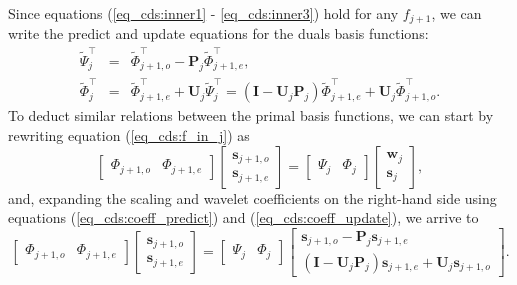 \documentclass[graybox]{svmult}
\begin{document}
	
	Since equations (\ref{eq_cds:inner1} - \ref{eq_cds:inner3}) hold for any $f_{j+1}$, we can write the predict and update equations for the duals basis functions:
	\begin{eqnarray}
	\tilde{\Psi}_j^\intercal & = & \tilde{\Phi}_{j+1,o}^\intercal - \mathbf{P}_j \tilde{\Phi}_{j+1,e}^\intercal, \\
	\tilde{\Phi}_j^\intercal & = & \tilde{\Phi}_{j+1,e}^\intercal + \mathbf{U}_j \tilde{\Psi}_j^\intercal  =  (\mathbf{I} - \mathbf{U}_j\mathbf{P}_j) \tilde{\Phi}_{j+1,e}^\intercal + \mathbf{U}_j  \tilde{\Phi}_{j+1,o}^\intercal.
	\end{eqnarray}
	To deduct similar relations between the primal basis functions, we can start by rewriting equation (\ref{eq_cds:f_in_j}) as
	\begin{equation}
	\begin{bmatrix} \Phi_{j+1,o} & \Phi_{j+1,e} \end{bmatrix} \begin{bmatrix} \mathbf{s}_{j+1,o} \\ \mathbf{s}_{j+1,e} \end{bmatrix} = 
	\begin{bmatrix}\Psi_j & \Phi_j \end{bmatrix} \begin{bmatrix} \mathbf{w}_j \\ \mathbf{s}_j \end{bmatrix},
	\end{equation}
	and, expanding the scaling and wavelet coefficients on the right-hand side using equations (\ref{eq_cds:coeff_predict}) and (\ref{eq_cds:coeff_update}), we arrive to
	\begin{equation}
	\begin{bmatrix} \Phi_{j+1,o} & \Phi_{j+1,e} \end{bmatrix} \begin{bmatrix} \mathbf{s}_{j+1,o} \\ \mathbf{s}_{j+1,e} \end{bmatrix} = 
	\begin{bmatrix}\Psi_j & \Phi_j \end{bmatrix} \begin{bmatrix}  \mathbf{s}_{j+1,o} - \mathbf{P}_j \mathbf{s}_{j+1,e} \\ (\mathbf{I} - \mathbf{U}_j \mathbf{P}_j)\mathbf{s}_{j+1,e} + \mathbf{U}_j \mathbf{s}_{j+1,o} \end{bmatrix}.
	\label{eq_cds:lifting_matrix_form}
	\end{equation}
\end{document}
